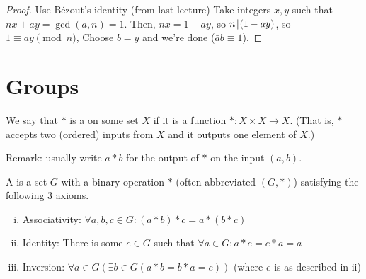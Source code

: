 \documentclass[notes.tex]{subfiles}
\begin{document}
\begin{proof}
	Use B\'ezout's identity (from last lecture)
	Take integers $x, y$ such that $nx+ay = \gcd(a, n)=1$.
	Then, $nx = 1-ay$, so $n\mkern2mu|\mkern1mu (1-ay)$, so $1\equiv ay\pmod n$, Choose $b=y$ and we're done ($\bar a \bar b \equiv \bar 1$).
\end{proof}

\chapter{Groups}

\begin{definition}
	We say that $*$ is a  on some set $X$ if it is a function $*:X\times X \to X$. (That is, $*$ accepts two (ordered) inputs from $X$ and it outputs one element of $X$.)
\end{definition}

Remark: usually write $a*b$ for the output of $*$ on the input $(a, b)$.

\begin{definition}
	A  is a set $G$ with a binary operation $*$ (often abbreviated $(G, *)$) satisfying the following 3 axioms.
\end{definition}
\begin{enumerate}[i.]
	\item Associativity: $\forall a, b, c\in G: (a*b) *c = a*(b*c)$
	\item Identity: There is some $e\in G$ such that $\forall a\in G: a*e = e*a = a$
	\item Inversion: $\forall a\in G(\exists b\in G(a*b=b*a = e))$ (where $e$ is as described in ii)
\end{enumerate}
\end{document}
